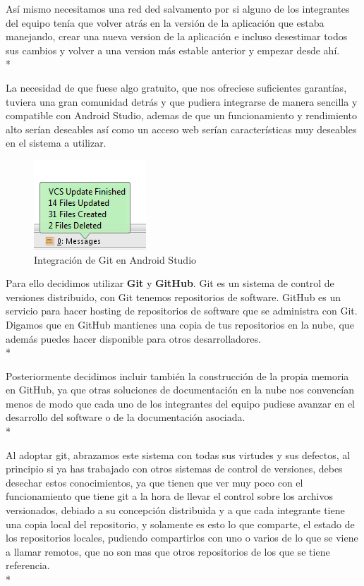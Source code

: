 \documentclass[../pfc.tex]{subfiles}
\begin{document}
	Así mismo necesitamos una red ded salvamento por si alguno de los integrantes del equipo tenía que volver atrás en la versión de la aplicación que estaba manejando, crear una nueva version de la aplicación e incluso desestimar todos sus cambios y volver a una version más estable anterior y empezar desde ahí.\\*
		
	La necesidad de que fuese algo gratuito, que nos ofreciese suficientes garantías, tuviera una gran comunidad detrás y que pudiera integrarse de manera sencilla y compatible con Android Studio, ademas de que un funcionamiento y rendimiento alto serían deseables así como un acceso web serían características muy deseables en el sistema a utilizar.  
	
	\begin{figure}[H]
		\centering
		\includegraphics[width=0.4\linewidth]{../images/VCS}
		\caption{Integración de Git en Android Studio}
		\label{fig:VCS}
	\end{figure}

	Para ello decidimos utilizar \textbf{Git} y \textbf{GitHub}.
	Git es un sistema de control de versiones distribuido, con Git tenemos repositorios de software. GitHub es un servicio para hacer hosting de repositorios de software que se administra con Git. Digamos que en GitHub mantienes una copia de tus repositorios en la nube, que además puedes hacer disponible para otros desarrolladores\cite{gitexplicacion}.\\* 
	
	Posteriormente decidimos incluir también la construcción de la propia memoria en GitHub, ya que otras soluciones de documentación en la nube nos convencían menos de modo que cada uno de los integrantes del equipo pudiese avanzar en el desarrollo del software o de la documentación asociada.\\*
	
	Al adoptar git, abrazamos este sistema con todas sus virtudes y sus defectos, al principio si ya has trabajado con otros sistemas de control de versiones, debes desechar estos conocimientos, ya que tienen que ver muy poco con el funcionamiento que tiene git a la hora de llevar el control sobre los archivos versionados, debiado a su concepción distribuida y a que cada integrante tiene una copia local del repositorio, y solamente es esto lo que comparte, el estado de los repositorios locales, pudiendo compartirlos con uno o varios de lo que se viene a llamar remotos, que no son mas que otros repositorios de los que se tiene referencia.\\*
	
\end{document}
